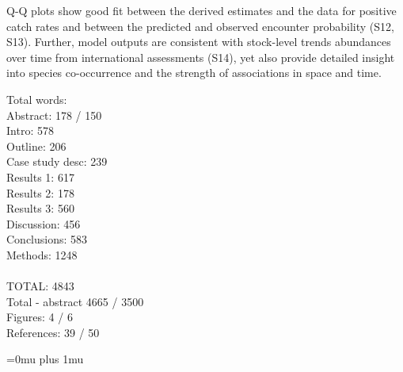 \documentclass{nature}
\begin{document}
\begin{linenumbers}
Q-Q plots show good fit between the derived estimates and the data for positive
catch rates and between the predicted and observed encounter probability (S12,
S13).  Further, model outputs are consistent with stock-level trends abundances
over time from international assessments (S14), yet also provide detailed
insight into species co-occurrence and the strength of associations in space
and time. 

Total words: \\
Abstract:	 	  178 / 150 \\
Intro:   		  578  \\
Outline:		  206 \\
Case study desc:	  239 \\
Results 1:		  617 \\
Results 2:		  178 \\
Results 3:		  560 \\
Discussion:	          456 \\
Conclusions:	          583  \\
Methods:		  1248 \\
\\
TOTAL:			 4843 \\
Total - abstract         4665 / 3500 \\

Figures: 4 / 6 \\
References: 39 / 50 \\

\end{linenumbers}
\newpage
\Urlmuskip=0mu plus 1mu\relax

\small{}



\end{document}
